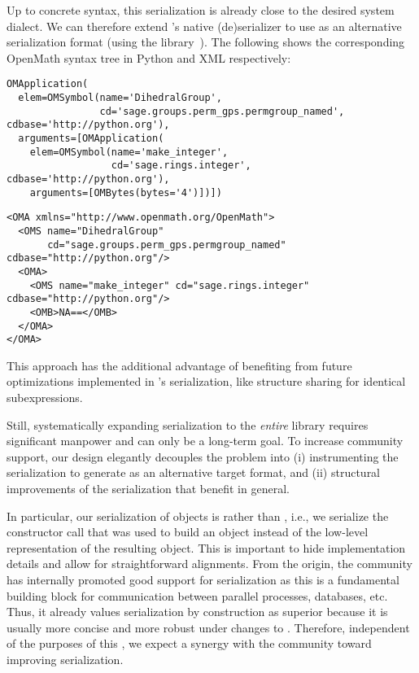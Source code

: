 Up to concrete syntax, this serialization is already close to the desired \Sage system dialect.
We can therefore extend \Python's native (de)serializer to use \OMMT as an alternative serialization format (using the \Python library~\cite{py-openmath:on}).
The following shows the corresponding OpenMath syntax tree in Python and XML respectively:
\begin{lstlisting}
OMApplication(
  elem=OMSymbol(name='DihedralGroup',
                cd='sage.groups.perm_gps.permgroup_named', cdbase='http://python.org'),
  arguments=[OMApplication(
    elem=OMSymbol(name='make_integer',
                  cd='sage.rings.integer', cdbase='http://python.org'),
    arguments=[OMBytes(bytes='4')])])
\end{lstlisting}
\begin{lstlisting}
<OMA xmlns="http://www.openmath.org/OpenMath">
  <OMS name="DihedralGroup"
       cd="sage.groups.perm_gps.permgroup_named" cdbase="http://python.org"/>
  <OMA>
    <OMS name="make_integer" cd="sage.rings.integer" cdbase="http://python.org"/>
    <OMB>NA==</OMB>
  </OMA>
</OMA>
\end{lstlisting}
This approach has the additional advantage of benefiting from future optimizations implemented in \Python's serialization, like structure sharing for identical subexpressions.




Still, systematically expanding \OMMT serialization to the \emph{entire} \Sage library requires significant manpower and can only be a long-term goal.
To increase community support, our design elegantly decouples the problem into (i) instrumenting the serialization to generate \OMMT as an alternative target format, and (ii) structural improvements of the serialization that benefit \Sage in general.

In particular, our serialization of \Sage objects is  rather than , i.e., we serialize the constructor call that was used to build an object instead of the low-level \Python representation of the resulting object.
This is important to hide implementation details and allow for straightforward alignments.
From the origin, the \Sage community has internally promoted
good support for serialization as this is a fundamental building
block for communication between parallel processes, databases, etc.
Thus, it already values serialization by construction as
superior because it is usually more concise and more robust under
changes to \Sage. Therefore, independent of the purposes of this
\papertype, we expect a synergy with the \Sage community toward improving
serialization.

